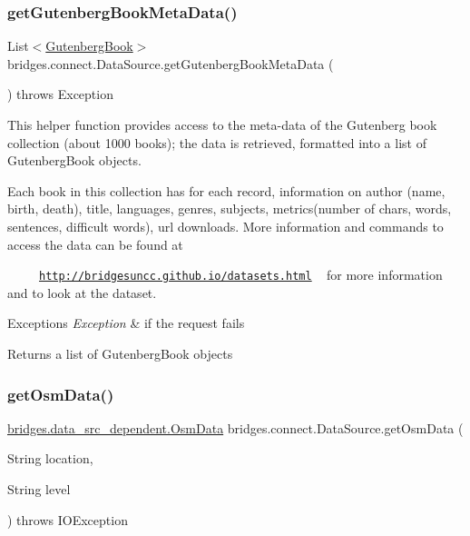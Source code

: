 \subsubsection{\texorpdfstring{get\+Gutenberg\+Book\+Meta\+Data()}{getGutenbergBookMetaData()}}
{\footnotesize\ttfamily List$<$\hyperlink{classbridges_1_1data__src__dependent_1_1_gutenberg_book}{Gutenberg\+Book}$>$ bridges.\+connect.\+Data\+Source.\+get\+Gutenberg\+Book\+Meta\+Data (\begin{DoxyParamCaption}{ }\end{DoxyParamCaption}) throws Exception}

This helper function provides access to the meta-\/data of the Gutenberg book collection (about 1000 books); the data is retrieved, formatted into a list of Gutenberg\+Book objects.

Each book in this collection has for each record, information on author (name, birth, death), title, languages, genres, subjects, metrics(number of chars, words, sentences, difficult words), url downloads. More information and commands to access the data can be found at 

~~~~~\href{http://bridgesuncc.github.io/datasets.html}{\tt http\+://bridgesuncc.\+github.\+io/datasets.\+html} ~\newline
 for more information and to look at the dataset.


\begin{DoxyExceptions}{Exceptions}
{\em Exception} & if the request fails\\
\hline
\end{DoxyExceptions}
\begin{DoxyReturn}{Returns}
a list of Gutenberg\+Book objects 
\end{DoxyReturn}
\mbox{\label{classbridges_1_1connect_1_1_data_source_ae82f6a4feff0af28f4aae55986e1560c}} 
\subsubsection{\texorpdfstring{get\+Osm\+Data()}{getOsmData()}\hspace{0.1cm}{\footnotesize\ttfamily [1/2]}}
{\footnotesize\ttfamily \hyperlink{classbridges_1_1data__src__dependent_1_1_osm_data}{bridges.\+data\+\_\+src\+\_\+dependent.\+Osm\+Data} bridges.\+connect.\+Data\+Source.\+get\+Osm\+Data (\begin{DoxyParamCaption}\item[{String}]{location,  }\item[{String}]{level }\end{DoxyParamCaption}) throws I\+O\+Exception}

